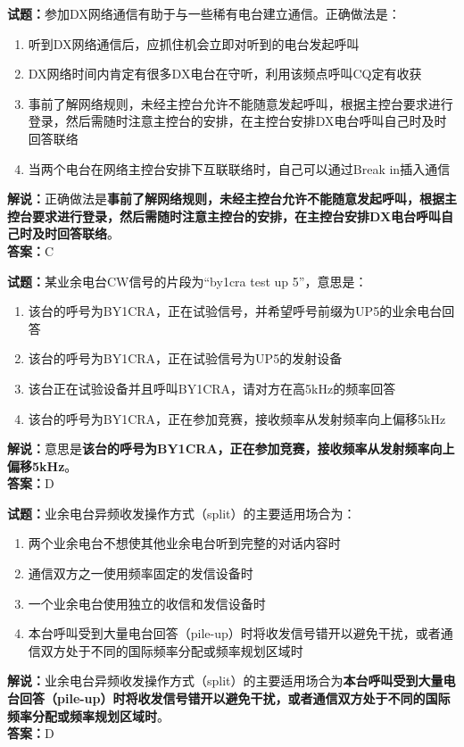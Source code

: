 \documentclass{ctexbook}
\begin{document}
\vspace{\baselineskip}

\noindent\textbf{试题：}参加DX网络通信有助于与一些稀有电台建立通信。正确做法是：
\begin{enumerate}[leftmargin=3em]
  \item 听到DX网络通信后，应抓住机会立即对听到的电台发起呼叫
  \item DX网络时间内肯定有很多DX电台在守听，利用该频点呼叫CQ定有收获
  \item 事前了解网络规则，未经主控台允许不能随意发起呼叫，根据主控台要求进行登录，然后需随时注意主控台的安排，在主控台安排DX电台呼叫自己时及时回答联络
  \item 当两个电台在网络主控台安排下互联联络时，自己可以通过Break in插入通信
\end{enumerate}
\noindent\textbf{解说：}正确做法是\textbf{事前了解网络规则，未经主控台允许不能随意发起呼叫，根据主控台要求进行登录，然后需随时注意主控台的安排，在主控台安排DX电台呼叫自己时及时回答联络}。\\\noindent\textbf{答案：}C

\vspace{\baselineskip}

\noindent\textbf{试题：}某业余电台CW信号的片段为“by1cra test up 5”，意思是：
\begin{enumerate}[leftmargin=3em]
  \item 该台的呼号为BY1CRA，正在试验信号，并希望呼号前缀为UP5的业余电台回答
  \item 该台的呼号为BY1CRA，正在试验信号为UP5的发射设备
  \item 该台正在试验设备并且呼叫BY1CRA，请对方在高5\unit{\kHz}的频率回答
  \item 该台的呼号为BY1CRA，正在参加竞赛，接收频率从发射频率向上偏移5\unit{\kHz}
\end{enumerate}
\noindent\textbf{解说：}意思是\textbf{该台的呼号为BY1CRA，正在参加竞赛，接收频率从发射频率向上偏移5\unit{\kHz}}。\\\noindent\textbf{答案：}D

\vspace{\baselineskip}

\noindent\textbf{试题：}业余电台异频收发操作方式（split）的主要适用场合为：
\begin{enumerate}[leftmargin=3em]
  \item 两个业余电台不想使其他业余电台听到完整的对话内容时
  \item 通信双方之一使用频率固定的发信设备时
  \item 一个业余电台使用独立的收信和发信设备时
  \item 本台呼叫受到大量电台回答（pile-up）时将收发信号错开以避免干扰，或者通信双方处于不同的国际频率分配或频率规划区域时
\end{enumerate}
\noindent\textbf{解说：}业余电台异频收发操作方式（split）的主要适用场合为\textbf{本台呼叫受到大量电台回答（pile-up）时将收发信号错开以避免干扰，或者通信双方处于不同的国际频率分配或频率规划区域时}。\\\noindent\textbf{答案：}D
\end{document}
